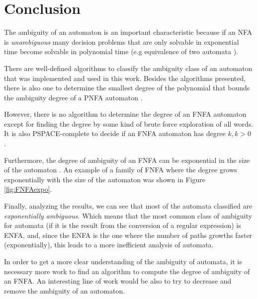 \chapter{Conclusion}

The ambiguity of an automaton is an important characteristic because if an NFA is \emph{unambiguous} many decision problems that are only solvable in exponential time become solvable in polynomial time (e.g equivalence of two automata \cite{StearnsH85}).

There are well-defined algorithms to classify the ambiguity class of an automaton that was implemented and used in this work. Besides the algorithms presented, there is also one to determine the smallest degree of the polynomial that bounds the ambiguity degree of a PNFA automaton \cite{Seidl89}.

However, there is no algorithm to determine the degree of an FNFA automaton except for finding the degree by some kind of brute force exploration of all words. It is also PSPACE-complete to decide if an FNFA automaton has degree $k, k>0$ \cite{ChanI83}.

Furthermore, the degree of ambiguity of an FNFA can be exponential in the size of the automaton \cite{Seidl89}. An example of a family of FNFA where the degree grows exponentially with the size of the automaton was shown in Figure \ref{fig:FNFAexpo}.

Finally, analyzing the results, we can see that most of the automata classified are \emph{exponentially ambiguous}. Which means that the most common class of ambiguity for automata (if it is the result from the conversion of a regular expression) is ENFA, and, since the ENFA is the one where the number of paths growths faster (exponentially), this leads to a more inefficient analysis of automata.

In order to get a more clear understanding of the ambiguity of automata, it is necessary more work to find an algorithm to compute the degree of ambiguity of an FNFA. An interesting line of work would be also to try to decrease and remove the ambiguity of an automaton.
